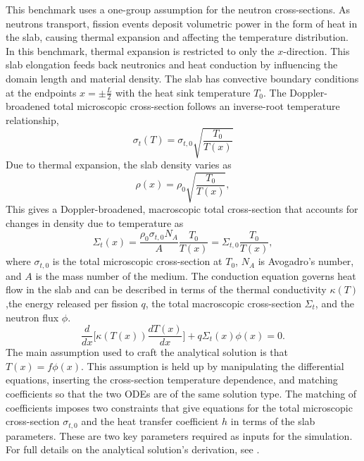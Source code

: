 \documentclass[letterpaper]{mc2023}
\begin{document}
This benchmark uses a one-group assumption for the neutron cross-sections. As neutrons transport, fission events deposit volumetric
power in the form of heat in the slab, causing thermal expansion and affecting the temperature distribution. In this benchmark,
thermal expansion is restricted to only the $x$-direction. This slab elongation feeds back neutronics and heat conduction by
influencing the domain length and material density. The slab has convective boundary conditions at the endpoints $x=\pm \frac{L}{2}$
with the heat sink temperature $T_{0}$. The Doppler-broadened total microscopic cross-section follows an inverse-root temperature
relationship,
\begin{equation}
    \sigma_{t}(T) = \sigma_{t,0}\sqrt{\frac{T_{0}}{T(x)}}
\end{equation}
Due to thermal expansion, the slab density varies as
\begin{equation} \label{sec:intro:density}
    \rho(x) =  \rho_{0} \sqrt{\frac{T_{0}}{T(x)}},
\end{equation}
This gives a Doppler-broadened, macroscopic total cross-section that accounts for changes in density due to temperature as
\begin{equation} \label{sec:intro:doppler}
    \Sigma_{t}(x) = \frac{\rho_{0}\sigma_{t,0} N_{A}}{A} \frac{T_{0}}{T(x)} = \Sigma_{t,0}\frac{T_{0}}{T(x)} ,
\end{equation}
where $ \sigma_{t,0}$ is the total microscopic cross-section at $T_{0}$, $N_{A}$ is Avogadro's number, and $A$ is the mass number
of the medium. The conduction equation governs heat flow in the slab and can be described in terms of the thermal conductivity
$\kappa(T)$,the energy released per fission $q$, the total macroscopic cross-section $\Sigma_{t}$, and the neutron flux $\phi$.
\begin{equation}
     \frac{d}{dx}\bigg[\kappa(T(x))\frac{dT(x)}{dx}\bigg] + q \Sigma_{t}(x)\phi(x) = 0.
\end{equation}
The main assumption used to craft the analytical solution is that $T(x)=f\phi(x)$. This assumption is held up by manipulating
the differential equations, inserting the cross-section temperature dependence, and matching coefficients so that the two ODEs
are of the same solution type. The matching of coefficients imposes two constraints that give equations for the total microscopic
cross-section $\sigma_{t,0}$ and the heat transfer coefficient $h$ in terms of the slab parameters. These are two key parameters
required as inputs for the simulation. For full details on the analytical solution's derivation, see \cite{analytical_benchmark}.
\end{document}
